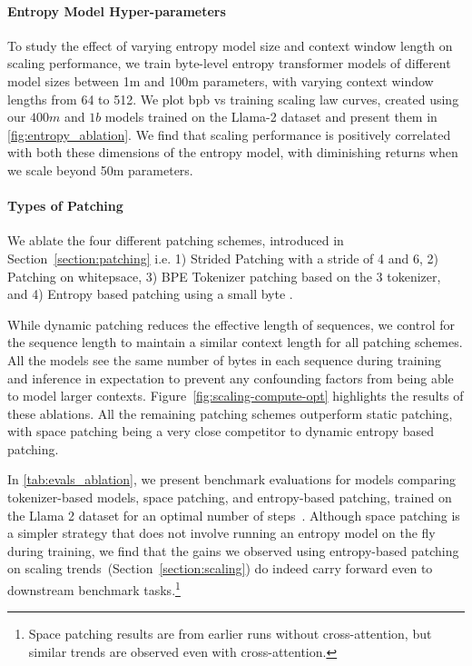 \documentclass[]{fairmeta}
\begin{document}
\paragraph{Entropy Model Hyper-parameters} To study the effect of varying entropy model size and context window length on scaling performance, we train byte-level entropy transformer models of different model sizes between 1m and 100m parameters, with varying context window lengths from 64 to 512. We plot bpb vs training \flop{} scaling law curves, created using our $400m$ and $1b$ \model{} models trained on the Llama-2 dataset and present them in \autoref{fig:entropy_ablation}. We find that scaling performance is positively correlated with both these dimensions of the entropy model, with diminishing returns when we scale beyond 50m parameters. 

\paragraph{Types of Patching}
We ablate the four different patching schemes, introduced in Section~\ref{section:patching} i.e. 1) Strided Patching with a stride of 4 and 6, 2) Patching on whitepsace, 3) BPE Tokenizer patching based on the \llama{} 3 tokenizer, and 4) Entropy based patching using a small byte \llm{}. 



While dynamic patching reduces the effective length of sequences, we control for the sequence length to maintain a similar context length for all patching schemes. All the models see the same number of bytes in each sequence during training and inference in expectation to prevent any confounding factors from being able to model larger contexts. Figure~\ref{fig:scaling-compute-opt} highlights the results of these ablations. All the remaining patching schemes outperform static patching, with space patching being a very close competitor to dynamic entropy based patching. 



In \autoref{tab:evals_ablation}, we present benchmark evaluations for \model{} models comparing tokenizer-based models, space patching, and entropy-based patching, trained on the Llama 2 dataset for an optimal number of steps~\citep{dubey2024llama}. Although space patching is a simpler strategy that does not involve running an entropy model on the fly during training, we find that the gains we observed using entropy-based patching on scaling trends~(Section~\ref{section:scaling}) do indeed carry forward even to downstream benchmark tasks.\footnote{Space patching results are from earlier runs without cross-attention, but similar trends are observed even with cross-attention.} 
\end{document}
